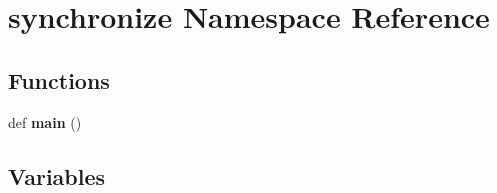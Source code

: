 \hypertarget{namespacesynchronize}{}\section{synchronize Namespace Reference}
\label{namespacesynchronize}
\subsection*{Functions}
\begin{DoxyCompactItemize}
\item 
def {\bfseries main} ()\hypertarget{namespacesynchronize_ab3d0b4edd521424969b29628a0717fca}{}\label{namespacesynchronize_ab3d0b4edd521424969b29628a0717fca}

\end{DoxyCompactItemize}
\subsection*{Variables}
